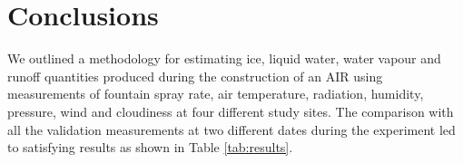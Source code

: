 \documentclass[utf8]{frontiersSCNS} %
\begin{document}
% 
% 
% 
% 
% 

\section{Conclusions} 
We outlined a methodology for estimating ice, liquid water, water vapour and runoff quantities produced during the
construction of an AIR using measurements of fountain spray rate, air temperature, radiation, humidity, pressure,
wind and cloudiness at four different study sites. The comparison with all the validation measurements at two different
dates during the experiment led to satisfying results as shown in Table \ref{tab:results}.
\end{document}
